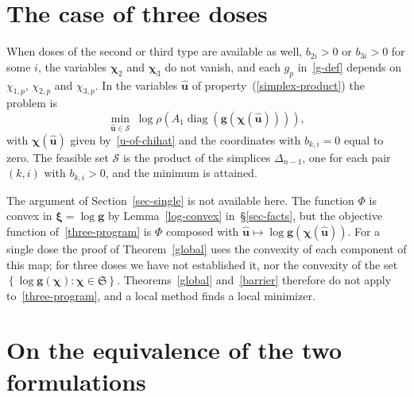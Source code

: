 \documentclass[11pt]{article}
\theoremstyle{plain}
\theoremstyle{definition}
\theoremstyle{remark}
\numberwithin{equation}{section}
\numberwithin{figure}{section}
\numberwithin{table}{section}
\begin{document}
\section{The case of three doses}\label{sec-three}

When doses of the second or third type are available as well, $b_{2i}>0$ or
$b_{3i}>0$ for some $i$, the variables $\bm\chi_2$ and $\bm\chi_3$ do not vanish,
and each $g_p$ in~\eqref{g-def} depends on $\chi_{1,p}$, $\chi_{2,p}$ and
$\chi_{3,p}$. In the variables $\widehat{\bm u}$ of property~(\ref{simplex-product})
the problem is
\begin{equation}\label{three-program}
\min_{\widehat{\bm u}\in\mathcal{S}}\
\log\rho\left(A_1\operatorname{diag}\left(\bm g\left(\bm\chi(\widehat{\bm u})\right)\right)\right),
\end{equation}
with $\bm\chi(\widehat{\bm u})$ given by~\eqref{u-of-chihat} and the
coordinates with $b_{k,i}=0$ equal to zero. The feasible set $\mathcal{S}$ is
the product of the simplices $\Delta_{n-1}$, one for each pair $(k,i)$ with
$b_{k,i}>0$, and the minimum is attained.

The argument of Section~\ref{sec-single} is not available here. The function
$\Phi$ is convex in $\bm\xi=\log\bm g$ by Lemma~\ref{log-convex} in~\S\ref{sec-facts}, but the
objective function of~\eqref{three-program} is $\Phi$ composed with
$\widehat{\bm u}\mapsto\log\bm g\left(\bm\chi(\widehat{\bm u})\right)$.
For a single dose the proof of Theorem~\ref{global} uses the convexity of each
component of this map; for three doses we have not established it, nor the
convexity of the set $\left\{\log\bm g(\bm\chi):\bm\chi\in\mathfrak{S}\right\}$. Theorems~\ref{global} and~\ref{barrier} therefore do not apply
to~\eqref{three-program}, and a local method finds a local minimizer.

\appendix

\section{On the equivalence of the two formulations}\label{sec-reduction}
\end{document}
